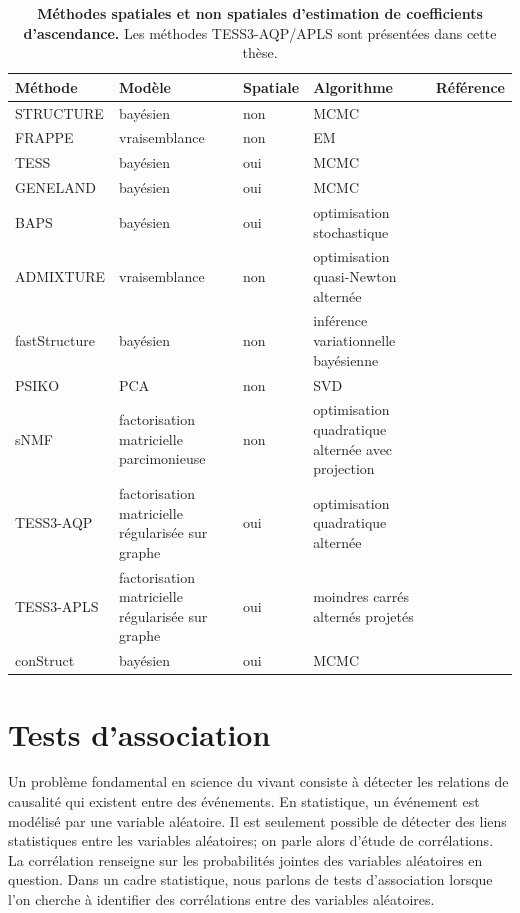 \documentclass[12pt,a4paper,twoside]{ugathesis}
\begin{document}
\begin{table}
\caption{\label{tab:org0629a90}
\textbf{Méthodes spatiales et non spatiales d'estimation de coefficients d'ascendance.} Les méthodes TESS3-AQP/APLS sont présentées dans cette thèse.}
\centering
\begin{tabular}{l|p{5cm}lp{5.5cm}|p{5.5cm}}
\hline
Méthode & Modèle & Spatiale & Algorithme & Référence\\
\hline
STRUCTURE & bayésien & non & MCMC & \citet{Pritchard2000,Falush1567}\\
FRAPPE & vraisemblance & non & EM & \citet{Tang_2005}\\
TESS & bayésien & oui & MCMC & \citet{CHEN_2007}\\
GENELAND & bayésien & oui & MCMC & \citet{phdGuedj}\\
BAPS & bayésien & oui & optimisation stochastique & \citet{Corander2008}\\
ADMIXTURE & vraisemblance & non & optimisation quasi-Newton alternée & \citet{alexander2009admixture,Alexander_2011}\\
fastStructure & bayésien & non & inférence variationnelle bayésienne & \citet{Raj_2014}\\
PSIKO & PCA & non & SVD & \citet{Popescu_2014}\\
sNMF & factorisation matricielle parcimonieuse & non & optimisation quadratique alternée avec projection & \citet{Frichot_2014}\\
TESS3-AQP & factorisation matricielle régularisée sur graphe & oui & optimisation quadratique alternée & \\
TESS3-APLS & factorisation matricielle régularisée sur graphe & oui & moindres carrés alternés projetés & \\
conStruct & bayésien & oui & MCMC & \citet{Bradburd189688}\\
\end{tabular}
\end{table}

\section{Tests d'association}
\label{sec:orgae53d8b}
Un problème fondamental en science du vivant consiste à détecter les relations
de causalité qui existent entre des événements. En statistique, un événement est
modélisé par une variable aléatoire. Il est seulement possible de détecter des
liens statistiques entre les variables aléatoires; on parle alors d'étude de
corrélations. La corrélation renseigne sur les probabilités jointes des
variables aléatoires en question. Dans un cadre statistique, nous parlons de
tests d'association lorsque l'on cherche à identifier des corrélations entre des
variables aléatoires.
\end{document}
